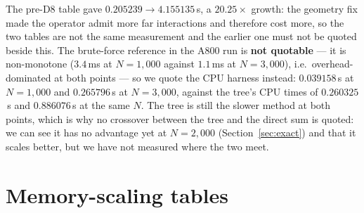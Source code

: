 \noindent The pre-D8 table gave $0.205239\to4.155135$\,s, a $20.25\times$ growth: the geometry fix
made the operator admit more far interactions and therefore cost more, so the two tables are not the
same measurement and the earlier one must not be quoted beside this. The brute-force reference in the
A800 run is \textbf{not quotable} --- it is non-monotone ($3.4$\,ms at $N=1{,}000$ against $1.1$\,ms at
$N=3{,}000$), i.e.\ overhead-dominated at both points --- so we quote the CPU harness instead:
$0.039158$\,s at $N=1{,}000$ and $0.265796$\,s at $N=3{,}000$, against the tree's CPU times of
$0.260325$\,s and $0.886076$\,s at the same $N$. The tree is still the slower method at both points,
which is why no crossover between the tree and the direct sum is quoted: we can see it has no
advantage yet at $N=2{,}000$ (Section~\ref{sec:exact}) and that it scales better, but we have not
measured where the two meet.

\section{Memory-scaling tables}\label{app:memtable}
\begin{table}[h]
\centering
\caption{Peak CUDA allocation for a single forward pass, hidden $64$, interaction list
\emph{uncapped}, post-D8, one A800 (\texttt{scripts/\allowbreak benchmark\_\allowbreak memory.\allowbreak py}). The $2.3$M row failed
under the default caching allocator and completed at $71.42$\,GB under
\texttt{expandable\_segments:True}; it is the only row measured with that setting. Pre-D8 the same
series ended at $11794.97$\,MB.}\label{tab:mem}
\end{table}

